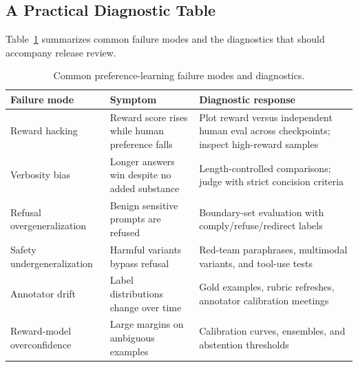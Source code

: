 \subsection{A Practical Diagnostic Table}
Table~\ref{tab:preference-failure-modes} summarizes common failure modes and the diagnostics that should accompany release review.

\begin{table}[t]
\centering
\begin{tabular}{p{}p{}p{}}
\toprule
Failure mode & Symptom & Diagnostic response \\
\midrule
Reward hacking & Reward score rises while human preference falls & Plot reward versus independent human eval across checkpoints; inspect high-reward samples \\
Verbosity bias & Longer answers win despite no added substance & Length-controlled comparisons; judge with strict concision criteria \\
Refusal overgeneralization & Benign sensitive prompts are refused & Boundary-set evaluation with comply/refuse/redirect labels \\
Safety undergeneralization & Harmful variants bypass refusal & Red-team paraphrases, multimodal variants, and tool-use tests \\
Annotator drift & Label distributions change over time & Gold examples, rubric refreshes, annotator calibration meetings \\
Reward-model overconfidence & Large margins on ambiguous examples & Calibration curves, ensembles, and abstention thresholds \\
\bottomrule
\end{tabular}
\caption{Common preference-learning failure modes and diagnostics.}
\label{tab:preference-failure-modes}
\end{table}

